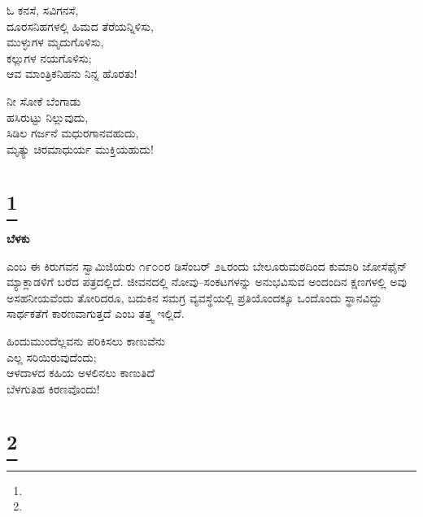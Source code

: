 \begin{myquote}
ಓ ಕನಸೆ, ಸವಿಗನಸೆ,\\ದೂರಸನಿಹಗಳಲ್ಲಿ ಹಿಮದ ತೆರೆಯನ್ನಿಳಿಸು,\\ಮುಳ್ಳುಗಳ ಮೃದುಗೊಳಿಸು,\\ಕಲ್ಲುಗಳ ನಯಗೊಳಿಸು;\\ಆವ ಮಾಂತ್ರಿಕನಿಹನು ನಿನ್ನ ಹೊರತು!
\end{myquote}

\begin{myquote}
ನೀ ಸೋಕೆ ಬೆಂಗಾಡು\\ಹಸಿರುಟ್ಟು ನಿಲ್ಲುವುದು,\\ಸಿಡಿಲ ಗರ್ಜನೆ ಮಧುರಗಾನವಹುದು,\\ಮೃತ್ಯು ಚಿರಮಾಧುರ್ಯ ಮುಕ್ತಿಯಹುದು!
\end{myquote}

\selecteng

\chapter[LIGHT]{\protect\footnote{}}

\begin{myquote}
\end{myquote}

\selectkan

\begin{center}
\textbf{ಬೆಳಕು}
\end{center}

 ಎಂಬ ಈ ಕಿರುಗವನ ಸ್ವಾಮಿಜಿಯರು ೧೯೦೦ರ ಡಿಸೆಂಬರ್ ೨೬ರಂದು ಬೇಲೂರುಮಠದಿಂದ ಕುಮಾರಿ ಜೋಸೆಫೈನ್ ಮ್ಯಾಕ್ಲಾಡಳಿಗೆ ಬರೆದ ಪತ್ರದಲ್ಲಿದೆ. ಜೀವನದಲ್ಲಿ ನೋವು–ಸಂಕಟಗಳನ್ನು ಅನುಭವಿಸುವ ಅಂದಂದಿನ ಕ್ಷಣಗಳಲ್ಲಿ ಅವು ಅಸಹನೀಯವೆಂದು ತೋರಿದರೂ, ಬದುಕಿನ ಸಮಗ್ರ ವ್ಯವಸ್ಥೆಯಲ್ಲಿ ಪ್ರತಿಯೊಂದಕ್ಕೂ ಒಂದೊಂದು ಸ್ಥಾನವಿದ್ದು ಸಾರ್ಥಕತೆಗೆ ಕಾರಣವಾಗುತ್ತದೆ ಎಂಬ ತತ್ತ್ವ ಇಲ್ಲಿದೆ.

\begin{myquote}
ಹಿಂದುಮುಂದೆಲ್ಲವನು ಪರಿಕಿಸಲು ಕಾಣುವೆನು\\ಎಲ್ಲ ಸರಿಯಿರುವುದೆಂದು;\\ಆಳದಾಳದ ಕಹಿಯ ಅಳಲಿನಲು ಕಾಣುತಿದೆ\\ಬೆಳಗುತಿಹ ಕಿರಣವೊಂದು!
\end{myquote}

\selecteng

\chapter[THE LIVING GOD]{\protect\footnote{}}

